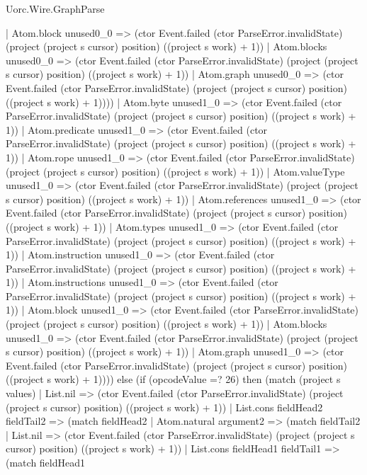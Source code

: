 \begin{lexlean}{Uorc.Wire.GraphParse}
\begin{semanticmodule}
{              | Atom.block unused0_0 => (ctor Event.failed (ctor ParseError.invalidState) (project (project s cursor) position) ((project s work) + 1))
              | Atom.blocks unused0_0 => (ctor Event.failed (ctor ParseError.invalidState) (project (project s cursor) position) ((project s work) + 1))
              | Atom.graph unused0_0 => (ctor Event.failed (ctor ParseError.invalidState) (project (project s cursor) position) ((project s work) + 1))))
          | Atom.byte unused1_0 => (ctor Event.failed (ctor ParseError.invalidState) (project (project s cursor) position) ((project s work) + 1))
          | Atom.predicate unused1_0 => (ctor Event.failed (ctor ParseError.invalidState) (project (project s cursor) position) ((project s work) + 1))
          | Atom.rope unused1_0 => (ctor Event.failed (ctor ParseError.invalidState) (project (project s cursor) position) ((project s work) + 1))
          | Atom.valueType unused1_0 => (ctor Event.failed (ctor ParseError.invalidState) (project (project s cursor) position) ((project s work) + 1))
          | Atom.references unused1_0 => (ctor Event.failed (ctor ParseError.invalidState) (project (project s cursor) position) ((project s work) + 1))
          | Atom.types unused1_0 => (ctor Event.failed (ctor ParseError.invalidState) (project (project s cursor) position) ((project s work) + 1))
          | Atom.instruction unused1_0 => (ctor Event.failed (ctor ParseError.invalidState) (project (project s cursor) position) ((project s work) + 1))
          | Atom.instructions unused1_0 => (ctor Event.failed (ctor ParseError.invalidState) (project (project s cursor) position) ((project s work) + 1))
          | Atom.block unused1_0 => (ctor Event.failed (ctor ParseError.invalidState) (project (project s cursor) position) ((project s work) + 1))
          | Atom.blocks unused1_0 => (ctor Event.failed (ctor ParseError.invalidState) (project (project s cursor) position) ((project s work) + 1))
          | Atom.graph unused1_0 => (ctor Event.failed (ctor ParseError.invalidState) (project (project s cursor) position) ((project s work) + 1)))) else (if (opcodeValue =? 26) then (match (project s values)
        | List.nil => (ctor Event.failed (ctor ParseError.invalidState) (project (project s cursor) position) ((project s work) + 1))
        | List.cons fieldHead2 fieldTail2 => (match fieldHead2
          | Atom.natural argument2 => (match fieldTail2
            | List.nil => (ctor Event.failed (ctor ParseError.invalidState) (project (project s cursor) position) ((project s work) + 1))
            | List.cons fieldHead1 fieldTail1 => (match fieldHead1
}
\end{semanticmodule}
\end{lexlean}
